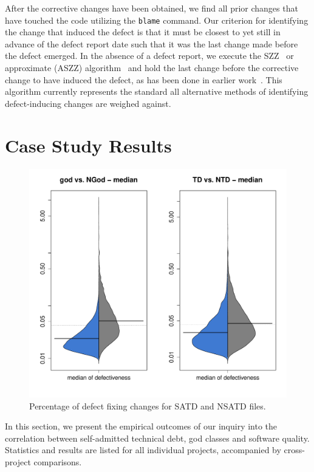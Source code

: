 After the corrective changes have been obtained, we find all prior changes that have touched the code utilizing the \texttt{blame} command. Our criterion for identifying the change that induced the defect is that it must be closest to yet still in advance of the defect report date such that it was the last change made before the defect emerged. In the absence of a defect report, we execute the SZZ~\cite{sliwerski-msr-2005} or approximate (ASZZ) algorithm~\cite{Kamei-tse-2013} and hold the last change before the corrective change to have induced the defect, as has been done in earlier work~\cite{Kamei-tse-2013}. This algorithm currently represents the standard all alternative methods of identifying defect-inducing changes are weighed against.

\section{Case Study Results}
\label{chap4:sec:case_study_results}

\begin{figure}[tb]
	\centering
	\includegraphics[width=140mm]{figures/chapter4/rq1_defectivness_distrubution}
	\caption{Percentage of defect fixing changes for SATD and NSATD files.}
	\label{figure:ch4_number_of_fixing_changes_TD_vs_NTD}
\end{figure}

In this section, we present the empirical outcomes of our inquiry into the correlation between self-admitted technical debt, god classes and software quality. Statistics and results are listed for all individual projects, accompanied by cross-project comparisons.

